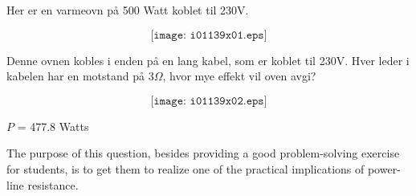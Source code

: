 

Her er en varmeovn på 500 Watt koblet til 230V. 

$$\texttt{[image: i01139x01.eps]}$$

Denne ovnen kobles i enden på en lang kabel, som er koblet til 230V. Hver leder i kabelen har en motstand på 3$\Omega$, hvor mye effekt vil oven avgi?

$$\texttt{[image: i01139x02.eps]}$$







$P$ = 477.8 Watts







The purpose of this question, besides providing a good problem-solving exercise for students, is to get them to realize one of the practical implications of power-line resistance.




